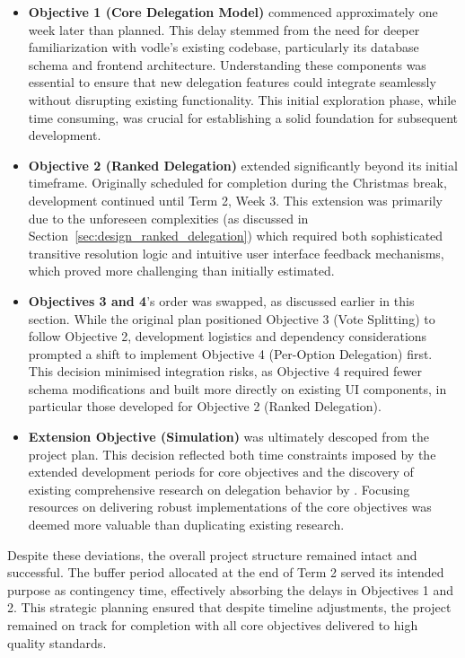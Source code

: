 \begin{itemize}
    \item \textbf{Objective 1 (Core Delegation Model)} commenced approximately one week later than planned. This delay stemmed from the need for deeper familiarization with vodle's existing codebase, particularly its database schema and frontend architecture. Understanding these components was essential to ensure that new delegation features could integrate seamlessly without disrupting existing functionality. This initial exploration phase, while time consuming, was crucial for establishing a solid foundation for subsequent development.
    \item \textbf{Objective 2 (Ranked Delegation)} extended significantly beyond its initial timeframe. Originally scheduled for completion during the Christmas break, development continued until Term 2, Week 3. This extension was primarily due to the unforeseen complexities (as discussed in Section~\ref{sec:design_ranked_delegation}) which required both sophisticated transitive resolution logic and intuitive user interface feedback mechanisms, which proved more challenging than initially estimated.
    \item \textbf{Objectives 3 and 4}'s order was swapped, as discussed earlier in this section. While the original plan positioned Objective 3 (Vote Splitting) to follow Objective 2, development logistics and dependency considerations prompted a shift to implement Objective 4 (Per-Option Delegation) first. This decision minimised integration risks, as Objective 4 required fewer schema modifications and built more directly on existing UI components, in particular those developed for Objective 2 (Ranked Delegation).
    \item \textbf{Extension Objective (Simulation)} was ultimately descoped from the project plan. This decision reflected both time constraints imposed by the extended development periods for core objectives and the discovery of existing comprehensive research on delegation behavior by \citet{brill_liquid_2021}. Focusing resources on delivering robust implementations of the core objectives was deemed more valuable than duplicating existing research.
\end{itemize}

Despite these deviations, the overall project structure remained intact and successful. The buffer period allocated at the end of Term 2 served its intended purpose as contingency time, effectively absorbing the delays in Objectives 1 and 2. This strategic planning ensured that despite timeline adjustments, the project remained on track for completion with all core objectives delivered to high quality standards.


